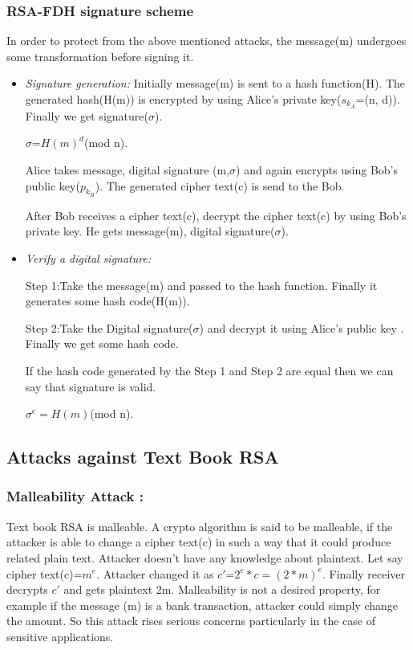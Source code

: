 \documentclass{article}
\begin{document}
\subsubsection{RSA-FDH signature scheme}
In order to protect from the above mentioned attacks, the message(m) undergoes some transformation before signing it.
\begin{itemize}
\item \textit{Signature generation: } Initially message(m) is sent to a hash function(H). The generated hash(H(m)) is encrypted by using Alice's private key($s_{k_{A}}$=(n, d)). Finally we get signature($\sigma$).


                      $\sigma$=$H(m)^{d}$(mod n).
                     

Alice takes message, digital signature (m,$\sigma$) and again encrypts using Bob's public key($p_{k_{B}}$). The generated cipher text(c) is send to the Bob.

After Bob receives a cipher text(c), decrypt the cipher text(c) by using Bob's private key. He gets message(m), digital signature($\sigma$). 

\item \textit{ Verify a digital signature: }

  Step 1:Take the message(m) and passed to the hash function. Finally it generates some hash code(H(m)).
  
  Step 2:Take the Digital signature($\sigma$) and decrypt it using Alice's public key . Finally we get some hash code.

 If the hash code generated by the Step 1 and Step 2 are equal then we can say that signature is valid.
 
                       $\sigma^{e}=H(m)$(mod n).
 \end{itemize}
 
 \subsection{Attacks against Text Book RSA}
 \subsubsection{Malleability Attack :}
 Text book RSA is malleable. A crypto algorithm is said to be malleable, if the attacker is able to change a cipher text(c) in such a way that it could produce related plain text. Attacker doesn't have any knowledge about plaintext. Let say cipher text(c)=$m^{e}$. Attacker changed it as $c'$=$2^{e}*c=(2*m)^{e}$. Finally receiver decrypts $c'$ and gets plaintext 2m.
Malleability is not a desired property, for example if the message (m) is a bank transaction, attacker could simply change the amount. So this attack rises serious concerns particularly in the case of sensitive applications. 
 
\end{document}
